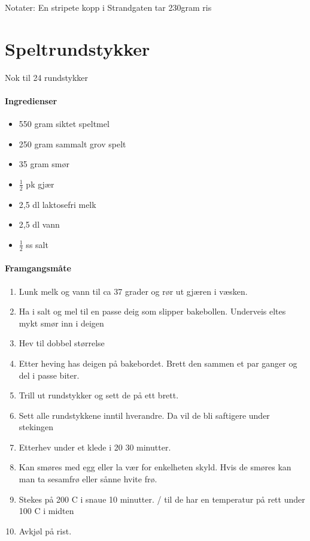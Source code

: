 \documentclass[12pt,a4paper]{book}
\begin{document}
Notater: En stripete kopp i Strandgaten tar 230gram ris
\clearpage{}
\clearpage{}\section{Speltrundstykker}
Nok til 24 rundstykker

\paragraph{Ingredienser}
\begin{itemize}[noitemsep]
	\item 550 gram siktet speltmel
	\item 250 gram sammalt grov spelt
	\item 35 gram smør
	\item  $\frac{1}{2}$  pk gjær
	\item 2,5 dl laktosefri melk
	\item 2,5 dl vann
	\item  $\frac{1}{2}$  ss salt
\end{itemize}


\paragraph{Framgangsmåte}
\begin{enumerate}[noitemsep]
	\item Lunk melk og vann til ca 37 grader og rør ut gjæren i væsken.
	\item Ha i salt og mel til en passe deig som slipper bakebollen. Underveis eltes mykt smør inn i deigen
	\item Hev til dobbel størrelse
	\item Etter heving has deigen på bakebordet. Brett den sammen et par ganger og del i passe biter.
	\item Trill ut rundstykker og sett de på ett brett.
	\item Sett alle rundstykkene inntil hverandre. Da vil de bli saftigere under stekingen
	\item Etterhev under et klede i 20 30 minutter.
	\item Kan smøres med egg eller la vær for enkelheten skyld. Hvis de smøres kan man ta sesamfrø eller sånne hvite frø.
	\item Stekes på 200 \degree C i snaue 10 minutter. / til de har en temperatur på rett under 100 \degree C i midten
	\item Avkjøl på rist.
\end{enumerate}
\end{document}
